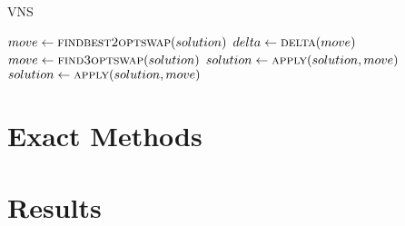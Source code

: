 \documentclass{article}
\begin{document}
\begin{algorithm}[h]
\caption{VNS}
\label{alg:vns}
\begin{algorithmic}
    \State{}

        \State $move \gets \Call{findbest2optswap}{solution}$
        \State $delta \gets \Call{delta}{move}$
				\State $move \gets \Call{find3optswap}{solution}$
		        \State $solution \gets \Call{apply}{solution, move}$
			\EndFor
		\Else
			\State $solution \gets \Call{apply}{solution, move}$
		\EndIf
    \EndWhile

  \EndProcedure

\end{algorithmic}
\end{algorithm}

\section{Exact Methods}
\section{Results}
\end{document}
